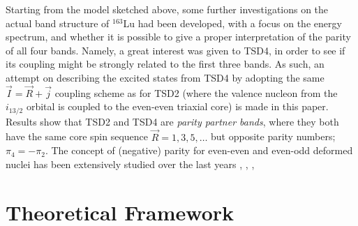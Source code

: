 \documentclass[%
 reprint,
 amsmath,
 amssymb,
 aps,
]{revtex4-2}
\begin{document}
Starting from the model sketched above, some further investigations on the actual band structure of $^{163}$Lu had been developed, with a focus on the energy spectrum, and whether it is possible to give a proper interpretation of the parity of all four bands. Namely, a great interest was given to TSD4, in order to see if its coupling might be strongly related to the first three bands. As such, an attempt on describing the excited states from TSD4 by adopting the same $\vec{I}=\vec{R}+\vec{j}$ coupling scheme as for TSD2 (where the valence nucleon from the $i_{13/2}$ orbital is coupled to the even-even triaxial core) is made in this paper. Results show that TSD2 and TSD4 are \emph{parity partner bands}, where they both have the same core spin sequence $\vec{R}=1,3,5,\dots$ but opposite parity numbers; $\pi_4=-\pi_2$. The concept of (negative) parity for even-even and even-odd deformed nuclei has been extensively studied over the last years \cite{raduta2006description}, \cite{raduta2006positive}, \cite{raduta2006simultaneous}, 

\section{Theoretical Framework}

\end{document}
